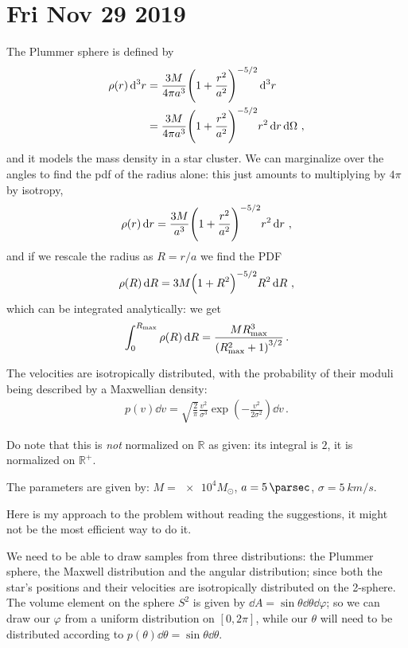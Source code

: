 \documentclass[main.tex]{subfiles}
\begin{document}
\section*{Fri Nov 29 2019}

The Plummer sphere is defined by 
%
\begin{subequations}
\begin{align}
  \rho (r) \dd[3]{r} &= \frac{3M}{4 \pi a^3} \qty(1 + \frac{r^2}{a^2})^{-5/2} \dd[3]{r}  \\
  &= \frac{3M}{4 \pi a^3} \qty(1 + \frac{r^2}{a^2})^{-5/2} r^2 \dd{r} \dd{\Omega }
\,,
\end{align}
\end{subequations}
%
and it models the mass density in a star cluster.
We can marginalize over the angles to find the pdf of the radius alone: this just amounts to multiplying by \(4 \pi \) by isotropy,
%
\begin{align}
  \rho (r) \dd{r} = \frac{3M}{a^3} \qty(1 + \frac{r^2}{a^2})^{-5/2} r^2 \dd{r}
\,,
\end{align}
%
and if we rescale the radius as \(R = r/a\) we find the PDF 
%
\begin{align}
  \rho (R) \dd{R} = 3M \qty(1 + R^2)^{-5/2} R^2 \dd{R}
\,,
\end{align}
%
which can be integrated analytically: we get 
%
\begin{align}
  \int_{0}^{R_{\text{max}}} \rho(R) \dd{R} = \frac{ M R^3 _{\text{max}}}{\qty(R^2 _{\text{max}} + 1)^{3/2}}
\,.
\end{align}
%

The velocities are isotropically distributed, with the probability of their moduli being described by a Maxwellian density: 
%
\begin{align}
  p(v) \dd{v} = \sqrt{\frac{2}{\pi }} \frac{v^2}{\sigma^3}
  \exp( -\frac{v^2}{2 \sigma^2}) \dd{v}
\,.
\end{align}

Do note that this is \emph{not} normalized on \(\mathbb{R}\) as given: its integral is \(2\), it is normalized on \(\mathbb{R}^{+}\).

The parameters are given by: \(M = \num{e4} M_{\odot}\), \(a = \SI{5}{\parsec}\), \(\sigma = \SI{5}{km/s}\).

Here is my approach to the problem without reading the suggestions, it might not be the most efficient way to do it. 

We need to be able to draw samples from three distributions: the Plummer sphere, the Maxwell distribution and the angular distribution; since both the star's positions and their velocities are isotropically distributed on the 2-sphere. 
The volume element on the sphere \(S^{2}\) is given by \(\dd{A} = \sin \theta \dd{\theta } \dd{\varphi }\); so we can draw our \(\varphi \) from a uniform distribution on \([0, 2 \pi ]\), while our \(\theta \) will need to be distributed according to \(p(\theta ) \dd{\theta }= \sin \theta \dd{\theta }  \). 
\end{document}
